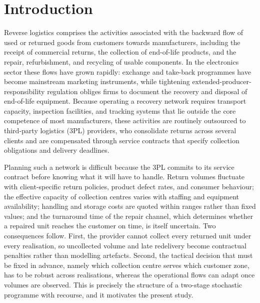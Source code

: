 \documentclass[11pt, a4paper]{article}
\begin{document}
\section{Introduction}
Reverse logistics comprises the activities associated with the backward flow of used or returned goods from customers towards manufacturers, including the receipt of commercial returns, the collection of end-of-life products, and the repair, refurbishment, and recycling of usable components. In the electronics sector these flows have grown rapidly: exchange and take-back programmes have become mainstream marketing instruments, while tightening extended-producer-responsibility regulation obliges firms to document the recovery and disposal of end-of-life equipment. Because operating a recovery network requires transport capacity, inspection facilities, and tracking systems that lie outside the core competence of most manufacturers, these activities are routinely outsourced to third-party logistics (3PL) providers, who consolidate returns across several clients and are compensated through service contracts that specify collection obligations and delivery deadlines.

Planning such a network is difficult because the 3PL commits to its
service contract before knowing what it will have to handle. Return
volumes fluctuate with client-specific return policies, product
defect rates, and consumer behaviour; the effective capacity of
collection centres varies with staffing and equipment availability;
handling and storage costs are quoted within ranges rather than fixed
values; and the turnaround time of the repair channel, which determines whether a repaired unit reaches the customer on time, is itself uncertain. Two consequences follow. First, the provider cannot collect every returned unit under every realisation, so uncollected volume and late redelivery become contractual penalties rather than modelling artefacts. Second, the tactical decision that must be fixed in advance, namely which collection centre serves which customer zone, has to be robust across realisations, whereas the operational flows can adapt once volumes are observed. This is precisely the structure of a two-stage stochastic programme with recourse, and it motivates the present study.
\end{document}
